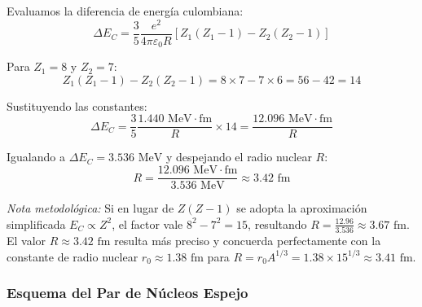 \begin{problema}
Evaluamos la diferencia de energía culombiana:
\begin{equation}
\Delta E_C = \frac{3}{5} \frac{e^2}{4\pi\varepsilon_0 R} \left[ Z_1(Z_1 - 1) - Z_2(Z_2 - 1) \right]
\end{equation}

Para $Z_1 = 8$ y $Z_2 = 7$:
\begin{equation}
Z_1(Z_1 - 1) - Z_2(Z_2 - 1) = 8 \times 7 - 7 \times 6 = 56 - 42 = 14
\end{equation}

Sustituyendo las constantes:
\begin{equation}
\Delta E_C = \frac{3}{5} \frac{1.440\text{ MeV}\cdot\text{fm}}{R} \times 14 = \frac{12.096\text{ MeV}\cdot\text{fm}}{R}
\end{equation}

Igualando a $\Delta E_C = 3.536\text{ MeV}$ y despejando el radio nuclear $R$:
\begin{equation}
R = \frac{12.096\text{ MeV}\cdot\text{fm}}{3.536\text{ MeV}} \approx 3.42\text{ fm}
\end{equation}

\textit{Nota metodológica:} Si en lugar de $Z(Z-1)$ se adopta la aproximación simplificada $E_C \propto Z^2$, el factor vale $8^2 - 7^2 = 15$, resultando $R = \frac{12.96}{3.536} \approx 3.67\text{ fm}$. El valor $R \approx 3.42\text{ fm}$ resulta más preciso y concuerda perfectamente con la constante de radio nuclear $r_0 \approx 1.38\text{ fm}$ para $R = r_0 A^{1/3} = 1.38 \times 15^{1/3} \approx 3.41\text{ fm}$.

\subsubsection*{Esquema del Par de Núcleos Espejo}

\begin{center}
\end{center}

\end{problema}
